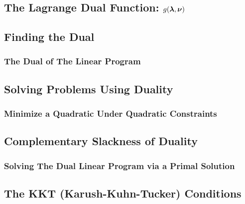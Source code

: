 \documentclass{article}
\begin{document}
\subsection{The Lagrange Dual Function: $g(\hbox{\boldmath$\lambda$}, \hbox{\boldmath$\nu$})$}

\subsection{Finding the Dual}

\subsubsection{The Dual of The Linear Program}

\subsection{Solving Problems Using Duality}

\subsubsection{Minimize a Quadratic Under Quadratic Constraints}

\subsection{Complementary Slackness of Duality}

\subsubsection{Solving The Dual Linear Program via a Primal Solution}

\subsection{The KKT (Karush-Kuhn-Tucker) Conditions}
\end{document}
